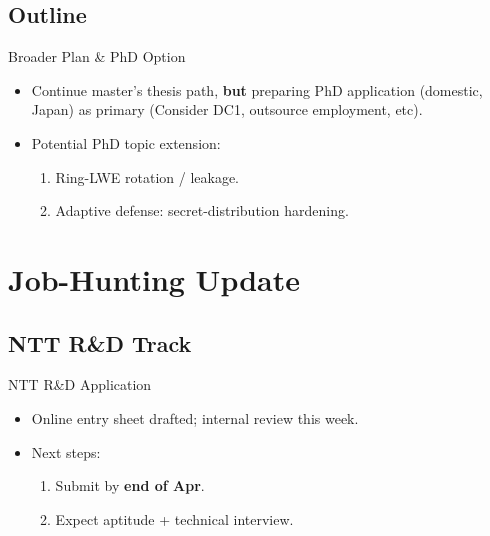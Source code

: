 \documentclass{beamer}
\begin{document}
\subsection{Outline}
\begin{frame}{Broader Plan \& PhD Option}
  \begin{itemize}
    \item Continue master's thesis path, \textbf{but} preparing PhD
          application (domestic, Japan) as primary  
          {\scriptsize(Consider DC1, outsource employment, etc)}.
    \item Potential PhD topic extension:
          \begin{enumerate}
            \item Ring-LWE rotation / leakage.
            \item Adaptive defense: secret-distribution hardening.
          \end{enumerate}
  \end{itemize}
\end{frame}

\section{Job-Hunting Update}

\subsection{NTT R\&D Track}
\begin{frame}{NTT R\&D Application}
  \begin{itemize}
    \item Online entry sheet drafted; internal review this week.
    \item Next steps:
          \begin{enumerate}
            \item Submit by \textbf{end of Apr}.
            \item Expect aptitude + technical interview.
          \end{enumerate}
  \end{itemize}
\end{frame}

\end{document}
